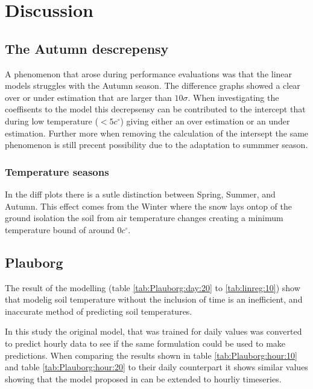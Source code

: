 \section{Discussion}

\subsection{The Autumn descrepensy}

A phenomenon that arose during performance evaluations was that the linear models struggles with the Autumn season. The difference graphs showed a clear over or under estimation that are larger than $10\sigma$. When investigating the coeffisents to the model  this decrepsensy can be contributed to the intercept that during low temperature ($<5c^\circ$) giving either an over estimation or an under estimation. Further more when removing the calculation of the intersept the same phenomenon is still precent possibility due to the adaptation to summmer season.

\subsubsection{Temperature seasons}

In the diff plots there is a sutle distinction between Spring, Summer, and Autumn. This effect comes from the Winter where the snow lays ontop of the ground isolation the soil from air temperature changes creating a minimum temperature bound of around $0c^\circ$. 

\subsection{Plauborg}

The result of the modelling (table \ref{tab:Plauborg:day:20} to \ref{tab:linreg:10}) show that modelig soil temperature without the inclusion of time is an inefficient, and inaccurate method of predicting soil temperatures.

In this study the original model, that was trained for daily values was converted to predict hourly data to see if the same formulation could be used to make predictions. When comparing the results shown in table \ref{tab:Plauborg:hour:10} and table \ref{tab:Plauborg:hour:20} to their daily counterpart it shows similar values showing that the model proposed in \citeauthor{plauborg_simple_2002} can be extended to hourliy timeseries.

